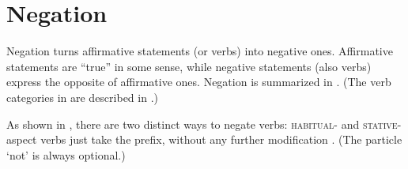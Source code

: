 \chapter{Negation} \label{ch:Negation}
Negation turns affirmative statements (or verbs) into negative ones. Affirmative statements are “true” in some sense, while negative statements (also verbs) express the opposite of affirmative ones. Negation is summarized in . (The verb categories in  are described in .)

\begin{table}
\caption{Negation}
\label{figtab:1:negation}
\end{table}

As shown in , there are two distinct ways to negate verbs: \textsc{habitual}- and \textsc{stative}-aspect verbs  just take the  \textsc{\negative} prefix, without any further modification . (The particle  ‘not’ is always optional.)

